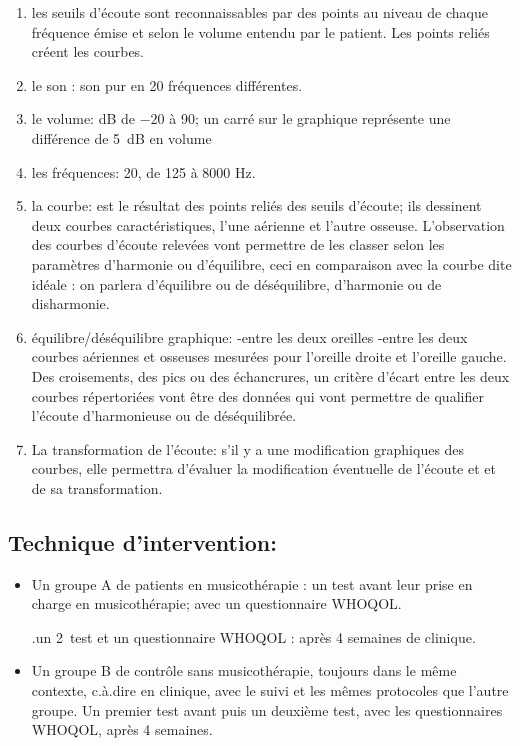  
  \begin{enumerate}
 	\item les seuils d'écoute sont reconnaissables par des points au niveau de 
          chaque fréquence émise et selon le volume entendu par le patient. Les points reliés créent les courbes.
 	\item le son : son pur en 20 fréquences différentes.  
 	\item le volume: dB de $-20$ à 90; un carré sur le graphique représente une différence de \SI{5}{\dB} en
 		volume 
 	\item les fréquences: 20, de 125 à 8000 Hz. 
 	\item la courbe: est le résultat des points reliés des seuils
          d'écoute; ils 
          dessinent deux courbes caractéristiques, l'une aérienne et l'autre osseuse.
          L'observation des courbes d'écoute relevées vont permettre
          de les classer selon les paramètres d'harmonie ou
          d'équilibre, ceci 
 	en comparaison avec la courbe dite idéale : on parlera
        d'équilibre ou de
 	déséquilibre, d'harmonie ou de disharmonie.
        
      \item équilibre/déséquilibre graphique:
        -entre les deux oreilles
        -entre les deux courbes aériennes et osseuses mesurées pour
        l'oreille droite et l'oreille gauche.
        Des croisements, des pics ou des échancrures, un critère
        d'écart
        entre les deux courbes répertoriées vont être des
        données qui vont permettre de
        qualifier l'écoute d'harmonieuse ou de
        déséquilibrée. 
        
 	\item La transformation de l'écoute: s'il y a une modification
          graphiques des courbes, elle 
          permettra d'évaluer la modification éventuelle de l'écoute et
          et de sa transformation.
          
\end{enumerate}
 
 



        	
        \subsection{Technique d'intervention:}


       
\begin{itemize}
	\item Un groupe A de patients en musicothérapie : un
          test avant leur prise en charge en musicothérapie; avec un questionnaire
          WHOQOL.
          
          .un 2\ieme\ test et un questionnaire WHOQOL : après 4 semaines de
          clinique.
          
	\item Un groupe B de contrôle sans musicothérapie,
	toujours dans le même contexte, c.à.dire en clinique, avec le suivi et les mêmes protocoles que l'autre groupe. Un premier test avant
 puis un deuxième test, avec les questionnaires WHOQOL, après 4 semaines. 
\end{itemize}

